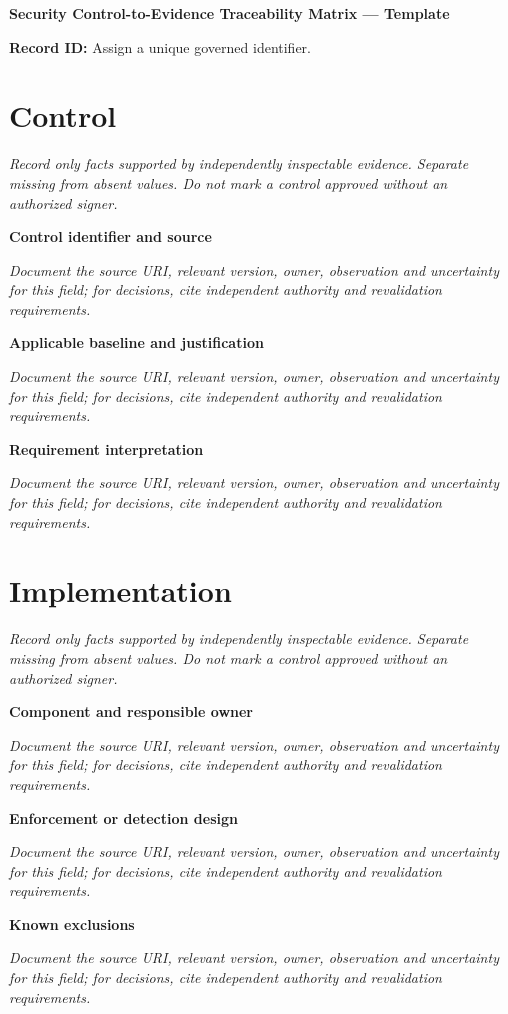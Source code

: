 \documentclass[11pt,letterpaper]{article}
\begin{document}
\begin{center}{\LARGE\bfseries Security Control-to-Evidence Traceability Matrix --- Template}\par
\vspace{4pt}{\small Guided authoring instrument (not a completed assessment)}\par
\end{center}
\noindent\textbf{Record ID:} Assign a unique governed identifier.\par
\section{Control}
\noindent\emph{Record only facts supported by independently inspectable evidence. Separate missing from absent values. Do not mark a control approved without an authorized signer.}\par
\noindent\textbf{Control identifier and source}\par
\noindent\emph{Document the source URI, relevant version, owner, observation and uncertainty for this field; for decisions, cite independent authority and revalidation requirements.}\par\medskip
\noindent\textbf{Applicable baseline and justification}\par
\noindent\emph{Document the source URI, relevant version, owner, observation and uncertainty for this field; for decisions, cite independent authority and revalidation requirements.}\par\medskip
\noindent\textbf{Requirement interpretation}\par
\noindent\emph{Document the source URI, relevant version, owner, observation and uncertainty for this field; for decisions, cite independent authority and revalidation requirements.}\par\medskip
\section{Implementation}
\noindent\emph{Record only facts supported by independently inspectable evidence. Separate missing from absent values. Do not mark a control approved without an authorized signer.}\par
\noindent\textbf{Component and responsible owner}\par
\noindent\emph{Document the source URI, relevant version, owner, observation and uncertainty for this field; for decisions, cite independent authority and revalidation requirements.}\par\medskip
\noindent\textbf{Enforcement or detection design}\par
\noindent\emph{Document the source URI, relevant version, owner, observation and uncertainty for this field; for decisions, cite independent authority and revalidation requirements.}\par\medskip
\noindent\textbf{Known exclusions}\par
\noindent\emph{Document the source URI, relevant version, owner, observation and uncertainty for this field; for decisions, cite independent authority and revalidation requirements.}\par\medskip
\end{document}

